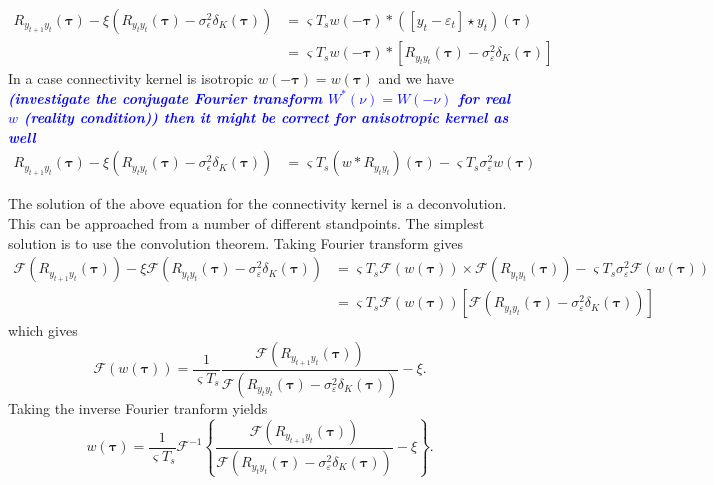 \documentclass[]{article}
\newcommand{\parham}[1]{\textsf{\emph{\textbf{\textcolor{blue}{#1}}}}}
\begin{document}
\begin{align}
	R_{y_{t+1}y_t}(\boldsymbol{\tau})-\xi \left(R_{y_ty_t}(\boldsymbol{\tau})-\sigma_{\epsilon}^2  \delta_{K}\left(\boldsymbol\tau\right)\right) &=  \varsigma T_s  w(-\boldsymbol\tau)\ast (\left[y_t-\varepsilon_t \right] \star y_t)(\boldsymbol\tau)\nonumber \\
&= \varsigma T_s  w(-\boldsymbol\tau) \ast\left[R_{y_ty_t}(\boldsymbol\tau)-\sigma_{\varepsilon}^2\delta_K(\boldsymbol\tau) \right] 
\end{align}
In a case  connectivity kernel is isotropic $ w(-\boldsymbol\tau)= w(\boldsymbol\tau)$ and we have \parham{(investigate the conjugate Fourier transform $ W^{*}(\nu)=W(-\nu)$ for real $w$ (reality condition)) then it might be correct for anisotropic kernel as well}
\begin{align}
	R_{y_{t+1}y_t}(\boldsymbol{\tau}) -\xi \left(R_{y_ty_t}(\boldsymbol{\tau})-\sigma_{\epsilon}^2  \delta_{K}\left(\boldsymbol\tau\right)\right)& = \varsigma T_s (w\ast R_{y_ty_t})(\boldsymbol\tau)-\varsigma T_s \sigma^2_{\varepsilon}w(\boldsymbol\tau) 
\end{align}

The solution of the above equation for the connectivity kernel is a deconvolution. This can be approached from a number of different standpoints. The simplest solution is to use the convolution theorem. Taking Fourier transform gives
\begin{align}
 \mathcal{F}\left(R_{y_{t+1}y_t}(\boldsymbol{\tau})\right)-\xi\mathcal{F}\left(R_{y_ty_t}(\boldsymbol{\tau})-\sigma^2_{\varepsilon}\delta_K(\boldsymbol\tau)\right)&=\varsigma T_s\mathcal{F}\left(w(\boldsymbol\tau)\right)\times \mathcal F\left(R_{y_ty_t}(\boldsymbol\tau)\right)-\varsigma T_s\sigma_{\varepsilon}^2\mathcal{F}\left(w(\boldsymbol\tau)\right) \nonumber \\
&=\varsigma T_s\mathcal{F}\left(w(\boldsymbol\tau)\right)\left[\mathcal{F}\left(R_{y_ty_t}(\boldsymbol{\tau})-\sigma^2_{\varepsilon}\delta_K(\boldsymbol\tau)\right) \right] 
\end{align}
 which gives
\begin{equation}\label{eq:FourierKernelSolution}
	\mathcal{F}\left(w(\boldsymbol\tau)\right) = \frac{1}{\varsigma T_s}\frac{\mathcal{F}\left(R_{y_{t+1}y_t}(\boldsymbol{\tau})\right)}{\mathcal{F}\left(R_{y_ty_t}(\boldsymbol{\tau})-\sigma^2_{\varepsilon}\delta_K(\boldsymbol\tau)\right)}-\xi.
\end{equation}
Taking the inverse Fourier tranform yields
\begin{equation}\label{eq:KernelSolution}
	w(\boldsymbol{\tau}) = \frac{1}{\varsigma T_s}\mathcal{F}^{-1}\left\{\frac{\mathcal{F}\left(R_{y_{t+1}y_t}(\boldsymbol{\tau})\right)}{\mathcal{F}\left(R_{y_ty_t}(\boldsymbol{\tau})-\sigma^2_{\varepsilon}\delta_K(\boldsymbol\tau)\right)}-\xi\right\}.
\end{equation}
\end{document}

